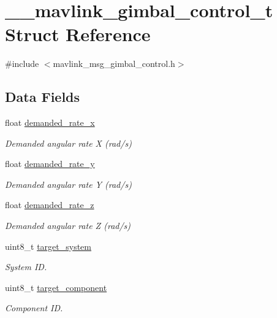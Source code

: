 \hypertarget{struct____mavlink__gimbal__control__t}{\section{\+\_\+\+\_\+mavlink\+\_\+gimbal\+\_\+control\+\_\+t Struct Reference}
\label{struct____mavlink__gimbal__control__t}
}


{\ttfamily \#include $<$mavlink\+\_\+msg\+\_\+gimbal\+\_\+control.\+h$>$}

\subsection*{Data Fields}
\begin{DoxyCompactItemize}
\item 
float \hyperlink{struct____mavlink__gimbal__control__t_af97051a2cc7d23d435df489f6ee1d8b8}{demanded\+\_\+rate\+\_\+x}
\begin{DoxyCompactList}\small\item\em Demanded angular rate X (rad/s) \end{DoxyCompactList}\item 
float \hyperlink{struct____mavlink__gimbal__control__t_aacf2ca3062b075251fae3fd5f68a8f9f}{demanded\+\_\+rate\+\_\+y}
\begin{DoxyCompactList}\small\item\em Demanded angular rate Y (rad/s) \end{DoxyCompactList}\item 
float \hyperlink{struct____mavlink__gimbal__control__t_ae29fb9d9c26ca80cbd069902470bfce1}{demanded\+\_\+rate\+\_\+z}
\begin{DoxyCompactList}\small\item\em Demanded angular rate Z (rad/s) \end{DoxyCompactList}\item 
uint8\+\_\+t \hyperlink{struct____mavlink__gimbal__control__t_a0c1e50b21e6492eb1549a78e372c0396}{target\+\_\+system}
\begin{DoxyCompactList}\small\item\em System I\+D. \end{DoxyCompactList}\item 
uint8\+\_\+t \hyperlink{struct____mavlink__gimbal__control__t_ae37c6ad909d441342df0a961c6a84d51}{target\+\_\+component}
\begin{DoxyCompactList}\small\item\em Component I\+D. \end{DoxyCompactList}\end{DoxyCompactItemize}


